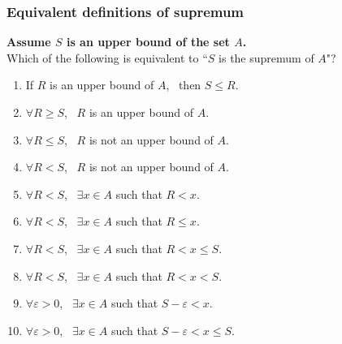 \begin{frame}[t]
	\fontsize{13}{13}\selectfont
	\frametitle{Equivalent definitions of supremum}

	{\bfseries Assume $S$ is an upper bound of the set $A$.} \\ Which of the following
	is equivalent to ``$S$ is the supremum of $A$"?
	\vspace{.2cm}
	\begin{enumerate}
		\item If $R$ is an upper bound of $A$, \, then $S \leq R$.
			\vspace{.2cm}

		\item $\displaystyle \forall R \geq S$, \, $R$ is an upper bound of $A$.

		\item $\displaystyle \forall R \leq S$, \, $R$ is not an upper bound of $A$.

		\item $\displaystyle \forall R < S$, \, $R$ is not an upper bound of $A$.
			\vspace{.2cm}

		\item $\displaystyle \forall R < S$, \, $\displaystyle \exists x \in A$ \;
			such that \; $\displaystyle R < x$.

		\item $\displaystyle \forall R < S$, \, $\displaystyle \exists x \in A$ \;
			such that \; $\displaystyle R \leq x$.

		\item $\displaystyle \forall R < S$, \, $\displaystyle \exists x \in A$ \;
			such that \; $\displaystyle R < x \leq S$.

		\item $\displaystyle \forall R < S$, \, $\displaystyle \exists x \in A$ \;
			such that \; $\displaystyle R < x < S$.
			\vspace{.2cm}

		\item $\displaystyle \forall \varepsilon>0$, \; \,
			$\displaystyle \exists x \in A$ \; such that \;
			$\displaystyle S - \varepsilon < x$.

		\item $\displaystyle \forall \varepsilon>0$, \; \,
			$\displaystyle \exists x \in A$ \; such that \;
			$\displaystyle S - \varepsilon < x \leq S$.
	\end{enumerate}
\end{frame}

